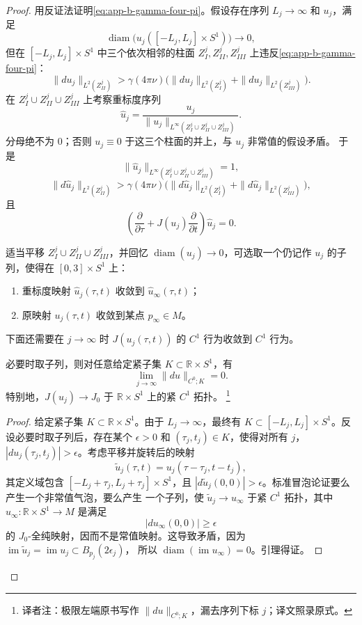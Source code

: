\begin{proof}
用反证法证明\eqref{eq:app-b-gamma-four-pi}。假设存在序列 $L_j\to\infty$ 和
$u_j$，满足
\[
 \operatorname{diam}\bigl(u_j([-L_j,L_j]\times S^1)\bigr)\longrightarrow0,
\]
但在 $[-L_j,L_j]\times S^1$ 中三个依次相邻的柱面
$Z_I^j,Z_{II}^j,Z_{III}^j$ 上违反\eqref{eq:app-b-gamma-four-pi}：
\[
 \|du_j\|_{L^2(Z_{II}^j)}
 >\gamma(4\pi\nu)
 \bigl(\|du_j\|_{L^2(Z_I^j)}+\|du_j\|_{L^2(Z_{III}^j)}\bigr).
\]
在 $Z_I^j\cup Z_{II}^j\cup Z_{III}^j$ 上考察重标度序列
\[
 \widehat u_j=
 \frac{u_j}{\|u_j\|_{L^\infty(Z_I^j\cup Z_{II}^j\cup Z_{III}^j)}}.
\]
分母绝不为 $0$；否则 $u_j\equiv0$ 于这三个柱面的并上，与 $u_j$ 非常值的假设矛盾。
于是
\[
 \|\widehat u_j\|_{L^\infty(Z_I^j\cup Z_{II}^j\cup Z_{III}^j)}=1,
\]
\[
 \|d\widehat u_j\|_{L^2(Z_{II}^j)}
 >\gamma(4\pi\nu)
 \bigl(\|d\widehat u_j\|_{L^2(Z_I^j)}
       +\|d\widehat u_j\|_{L^2(Z_{III}^j)}\bigr),
\]
且
\[
 \left(\frac\partial{\partial\tau}
 +J(u_j)\frac\partial{\partial t}\right)\widehat u_j=0.
\]

适当平移 $Z_I^j\cup Z_{II}^j\cup Z_{III}^j$，并回忆
$\operatorname{diam}(u_j)\to0$，可选取一个仍记作 $u_j$ 的子列，使得在
$[0,3]\times S^1$ 上：
\begin{enumerate}[label=(\arabic*)]
\item 重标度映射 $\widehat u_j(\tau,t)$ 收敛到 $\widehat u_\infty(\tau,t)$；
\item 原映射 $u_j(\tau,t)$ 收敛到某点 $p_\infty\in M$。
\end{enumerate}
下面还需要在 $j\to\infty$ 时 $J(u_j(\tau,t))$ 的 $C^1$ 行为收敛到 $C^1$ 行为。

\begin{lemma}
\label{lem:app-b-derivative-vanishing}
必要时取子列，则对任意给定紧子集 $K\subset\mathbb R\times S^1$，有
\[
 \lim_{j\to\infty}\|du\|_{C^0;K}=0.
\]
特别地，$J(u_j)\to J_0$ 于 $\mathbb R\times S^1$ 上的紧 $C^1$ 拓扑。
\footnote{译者注：极限左端原书写作 $\lVert du\rVert_{C^0;K}$，漏去序列下标
$j$；译文照录原式。}
\end{lemma}

\begin{proof}
给定紧子集 $K\subset\mathbb R\times S^1$。由于 $L_j\to\infty$，最终有
$K\subset[-L_j,L_j]\times S^1$。反设必要时取子列后，存在某个 $\epsilon>0$ 和
$(\tau_j,t_j)\in K$，使得对所有 $j$，
$|du_j(\tau_j,t_j)|>\epsilon$。考虑平移并旋转后的映射
\[
 \widetilde u_j(\tau,t)=u_j(\tau-\tau_j,t-t_j),
\]
其定义域包含 $[-L_j+\tau_j,L_j+\tau_j]\times S^1$，且
$|d\widetilde u_j(0,0)|>\epsilon$。标准冒泡论证要么产生一个非常值气泡，要么产生
一个子列，使 $\widetilde u_j\to u_\infty$ 于紧 $C^1$ 拓扑，其中
$u_\infty\colon\mathbb R\times S^1\to M$ 是满足
\[
 |du_\infty(0,0)|\geq\epsilon
\]
的 $J_0$-全纯映射，因而不是常值映射。这导致矛盾，因为
$\operatorname{im}\widetilde u_j=\operatorname{im}u_j\subset B_{p_j}(2\epsilon_j)$，
所以 $\operatorname{diam}(\operatorname{im}u_\infty)=0$。引理得证。
\end{proof}


\end{proof}

